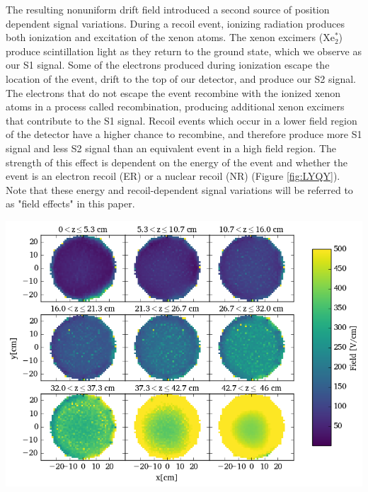 The resulting nonuniform drift field introduced a second source of position dependent signal variations.  During a recoil event, ionizing radiation produces both ionization and excitation of the xenon atoms.  The xenon excimers (Xe$_2^*$) produce scintillation light as they return to the ground state, which we observe as our S1 signal. Some of the electrons produced during ionization escape the location of the event, drift to the top of our detector, and produce our S2 signal.  The electrons that do not escape the event recombine with the ionized xenon atoms in a process called recombination, producing additional xenon excimers that contribute to the S1 signal.  Recoil events which occur in a lower field region of the detector have a higher chance to recombine, and therefore produce more S1 signal and less S2 signal than an equivalent event in a high field region.  The strength of this effect is dependent on the energy of the event and whether the event is an electron recoil (ER) or a nuclear recoil (NR) (Figure \ref{fig:LYQY}).  Note that these energy and recoil-dependent signal variations will be referred to as "field effects" in this paper.  

\begin{center}
\includegraphics[scale=0.48]{figures/Fig1.png}
 \label{fig:FieldMapExample}
\end{center}


